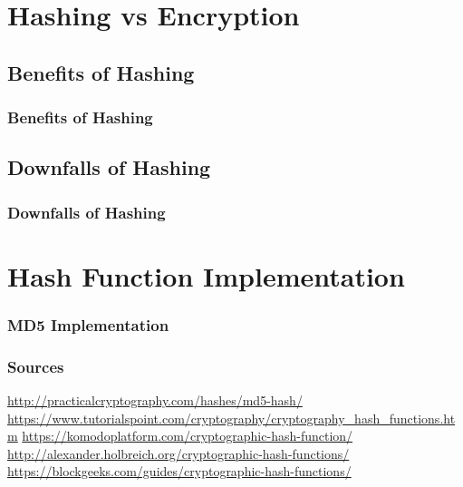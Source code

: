 \documentclass{beamer}
\begin{document}
\section{Hashing vs Encryption}

\subsection{Benefits of Hashing}
\begin{frame}
\frametitle{Benefits of Hashing}

\end{frame}


\subsection{Downfalls of Hashing}
\begin{frame}
\frametitle{Downfalls of Hashing}

\end{frame}

\section{Hash Function Implementation}

\begin{frame}
\frametitle{MD5 Implementation}

\end{frame}

\begin{frame}
\frametitle{Sources}
\begin{thebibliography}{}
	\beamertemplatebookbibitems
	\url{http://practicalcryptography.com/hashes/md5-hash/}
	\url{https://www.tutorialspoint.com/cryptography/cryptography_hash_functions.htm}
	\url{https://komodoplatform.com/cryptographic-hash-function/}
	\url{http://alexander.holbreich.org/cryptographic-hash-functions/}
	\url{https://blockgeeks.com/guides/cryptographic-hash-functions/}
\end{thebibliography}
\end{frame}



%		
\end{document}
